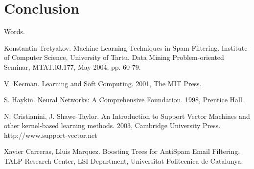 \documentclass[12pt]{report}
\begin{document}
\newpage

\chapter*{Conclusion}

Words.

\newpage


\begin{thebibliography}{30}

 Konstantin Tretyakov. Machine Learning Techniques in Spam Filtering. Institute of Computer Science, University of Tartu. Data Mining Problem-oriented Seminar, MTAT.03.177, May 2004, pp. 60-79.

 V. Kecman. Learning and Soft Computing. 2001, The MIT Press.

 S. Haykin. Neural Networks: A Comprehensive Foundation. 1998, Prentice
Hall.

 N. Cristianini, J. Shawe-Taylor. An Introduction to Support Vector Machines and other kernel-based learning methods. 2003, Cambridge University Press. http://www.support-vector.net

 Xavier Carreras, Lluis Marquez. Boosting Trees for AntiSpam
Email Filtering. TALP Research Center, LSI Department, Universitat Politecnica de Catalunya.

\end{thebibliography}
\end{document}
